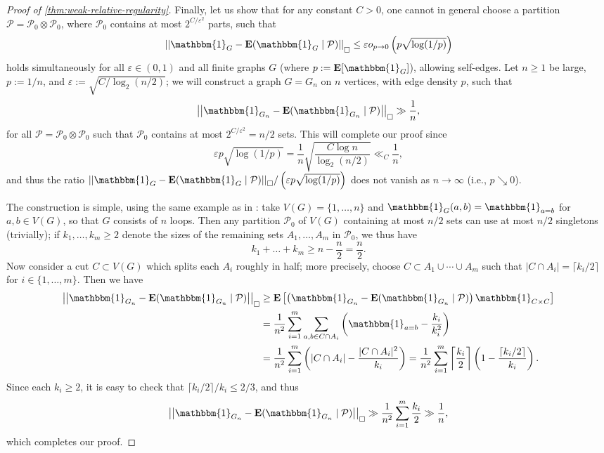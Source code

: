 \documentclass[reqno,11pt]{amsart}
\theoremstyle{definition}
\theoremstyle{remark}
\numberwithin{equation}{section}
\newcommand{\E}{\mathbf{E}}
\newcommand{\mP}{\mathcal{P}}
\newcommand{\one}{\mathbbm{1}}
\newcommand{\eps}{\varepsilon}
\newcommand{\sq}{_{\substack{ \\ \square}}}
\begin{document}
\begin{proof}[Proof of \cref{thm:weak-relative-regularity}]
Finally, let us show that for any constant $C > 0$, one cannot in general choose a partition $\mP = \mP_0 \otimes \mP_0$, where $\mP_0$ contains at most $2^{C/\eps^2}$ parts, such that 
\[
    \left\vert\left\vert \one_G - \E(\one_G \mid \mP)\right\vert\right\vert\sq \le \eps o_{p \to 0}\left(p \sqrt{\log(1/p)}\right)
\]
holds simultaneously for all $\eps \in (0, 1)$ and all finite graphs $G$ (where $p := \E[\one_G]$), allowing self-edges. Let $n \ge 1$ be large, $p := 1/n$, and $\eps := \sqrt{C/\log_2 (n/2)}$; we will construct a graph $G = G_n$ on $n$ vertices, with edge density $p$, such that
\[
    \left\vert\left\vert \one_{G_n} - \E(\one_{G_n} \mid \mP) \right\vert\right\vert\sq \gg 
    \frac{1}{n},
\]
for all $\mP = \mP_0 \otimes \mP_0$ such that $\mP_0$ contains at most $2^{C/\eps^2} = n/2$ sets. This will complete our proof since 
\[
    \eps p \sqrt{\log(1/p)} = \frac{1}{n} \sqrt{\frac{C \log n}{\log_2(n/2)}} 
    \ll_C 
    \frac{1}{n},
\]
and thus the ratio $||\one_G - \E(\one_G \mid \mP)||\sq / \left(\eps p \sqrt{\log(1/p)}\right)$ does not vanish as $n \to \infty$ (i.e., $p \searrow 0$).

The construction is simple, using the same example as in \cite[below Theorem 2.2]{conlon2021regularity}: take $V(G) = \{1, \ldots, n\}$ and $\one_G(a, b) = \one_{a = b}$ for $a, b \in V(G)$, so that $G$ consists of $n$ loops. Then any partition $\mP_0$ of $V(G)$ containing at most $n/2$ sets can use at most $n/2$ singletons (trivially); if $k_1, \ldots, k_m \ge 2$ denote the sizes of the remaining sets $A_1, \ldots, A_m$ in $\mP_0$, we thus have
\[
    k_1 + \ldots + k_m \ge n - \frac{n}{2} = \frac{n}{2}.
\]
Now consider a cut $C \subset V(G)$ which splits each $A_i$ roughly in half; more precisely, choose $C \subset A_1 \cup \cdots \cup A_m$ such that $|C \cap A_i| = \lceil k_i/2 \rceil$ for $i \in \{1, \ldots, m\}$. Then we have 
\[
\begin{aligned}
    \left\vert\left\vert \one_{G_n} - \E(\one_{G_n} \mid \mP) \right\vert\right\vert\sq
    &\ge 
    \E \left[ \left( \one_{G_n} - \E(\one_{G_n} \mid \mP)\right)\one_{C \times C} \right]
    \\
    &=
    \frac{1}{n^2}\sum_{i=1}^m \sum_{a, b \in C \cap A_i} \left(\one_{a=b} - \frac{k_i}{k_i^2}\right)
    \\
    &=
    \frac{1}{n^2}\sum_{i=1}^m \left(|C \cap A_i| - \frac{|C \cap A_i|^2}{k_i} \right)
    =
    \frac{1}{n^2}\sum_{i=1}^m \left\lceil \frac{k_i}{2} \right\rceil \left(1 - \frac{\lceil k_i/2 \rceil}{k_i} \right).
\end{aligned}
\]
Since each $k_i \ge 2$, it is easy to check that $\lceil k_i/2 \rceil/k_i \le 2/3$, and thus
\[
    \left\vert\left\vert \one_{G_n} - \E(\one_{G_n} \mid \mP) \right\vert\right\vert\sq
    \gg \frac{1}{n^2} \sum_{i=1}^m \frac{k_i}{2} \gg \frac{1}{n},
\]
which completes our proof.
\end{proof}
\end{document}
